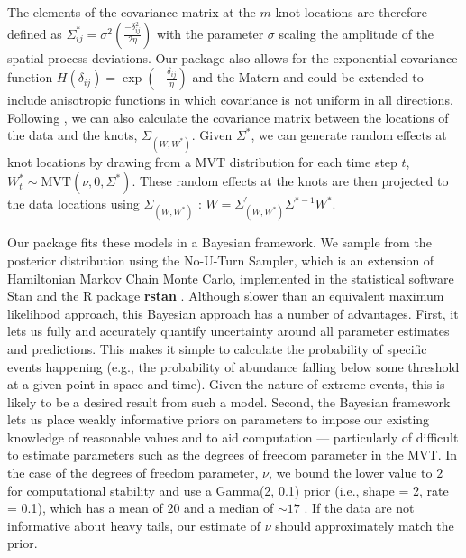 \documentclass[12pt,english]{article}
\begin{document}
\begin{spacing}{1.5}
The elements of the covariance matrix at the $m$ knot locations are therefore
defined as $\Sigma_{ij}^*=\sigma^2 \left( \frac{-\delta_{ij}^2}{2 \eta}  \right)$ with the
parameter $\sigma$ scaling the amplitude of the spatial process deviations. Our
package also allows for the exponential covariance function $H(\delta_{ij}) =
\exp \left(-\frac{\delta_{ij} }{\eta} \right)$ and the Matern and could be
extended to include anisotropic
functions in which covariance is not uniform in all directions.
Following \citet{latimer2009}, we can also calculate the covariance matrix
between the locations of the data and the knots,
$\Sigma_{\left(W, W^* \right)}$.
Given $\Sigma^*$, we can generate random effects at knot
locations by drawing from a MVT distribution for each time step $t$,
$W_t^*\sim \mathrm{MVT}\left( \nu, 0, \Sigma^{*} \right)$.
These random effects at the knots are then projected to the data locations using
$\Sigma_{\left( W,W^{*} \right)}$ \citep{latimer2009}:
$W=\Sigma_{\left(W,W^* \right)}^{'} \Sigma^{*-1}W^*$.

Our package fits these models in a Bayesian framework. We sample
from the posterior distribution using the No-U-Turn Sampler, which is an
extension of Hamiltonian Markov Chain Monte Carlo, implemented in the
statistical software Stan \citep{standevelopmentteam2016a, carpenter2017}
and the R package \textbf{rstan} \citep{standevelopmentteam2016}. Although slower
than an equivalent maximum likelihood approach, this Bayesian approach has a
number of advantages. First, it lets us fully and accurately quantify
uncertainty around all parameter estimates and predictions. This makes it
simple to calculate the probability of specific events happening (e.g., the
probability of abundance falling below some threshold at a given point in space
and time). Given the nature of extreme events, this is likely to be a desired
result from such a model. Second, the Bayesian framework lets us place weakly
informative priors on parameters to impose our existing knowledge of reasonable
values and to aid computation --- particularly of difficult to estimate
parameters such as the degrees of freedom parameter in the MVT. In the case of
the degrees of freedom parameter, $\nu$, we bound the lower value to $2$ for
computational stability and use a Gamma(2, 0.1) prior (i.e., shape = 2, rate = 0.1),
which has a mean of $20$ and a median of $\sim 17$ \citep{juarez2010}.
If the data are not informative about heavy
tails, our estimate of $\nu$ should approximately match the prior.


\end{spacing}
\end{document}
